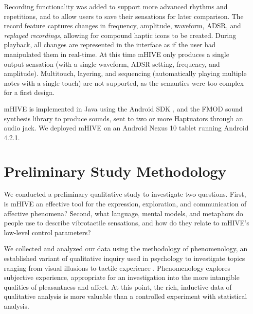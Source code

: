 Recording functionality was added to support more advanced rhythms and repetitions, and to allow users to save their sensations for later comparison.
The record feature captures changes in frequency, amplitude, waveform, ADSR, and \emph{replayed recordings}, allowing for compound haptic icons to be created.
During playback, all changes are represented in the interface as if the user had manipulated them in real-time.
At this time mHIVE only produces a single output sensation (with a single waveform, ADSR setting, frequency, and amplitude).
Multitouch, layering, and sequencing (automatically playing multiple notes with a single touch) are not supported, as the semantics were too complex for a first design.



mHIVE is implemented in Java using the Android SDK \cite{AndroidOpenSourceProject2012}, and the FMOD sound synthesis library \cite{fmod2013} to produce sounds, sent to two or more Haptuators through an audio jack.
We deployed mHIVE on an Android Nexus 10 tablet running Android 4.2.1.



%
% 
\section{Preliminary Study Methodology}

We conducted a preliminary qualitative study to investigate two questions.
First, is mHIVE an effective tool for the expression, exploration, and communication of affective phenomena?
Second, what language, mental models, and metaphors do people use to describe vibrotactile sensations, and how do they relate to mHIVE's low-level control parameters?

We collected and analyzed our data using the methodology of phenomenology, 
an established variant of qualitative inquiry used in psychology to investigate topics ranging from visual illusions to tactile experience \cite{Richer1978, Obrist2013, Creswell2013}.
Phenomenology explores subjective experience, appropriate for an investigation into the more intangible qualities of pleasantness and affect.
At this point, the rich, inductive data of qualitative analysis is more valuable than a controlled experiment with statistical analysis.

